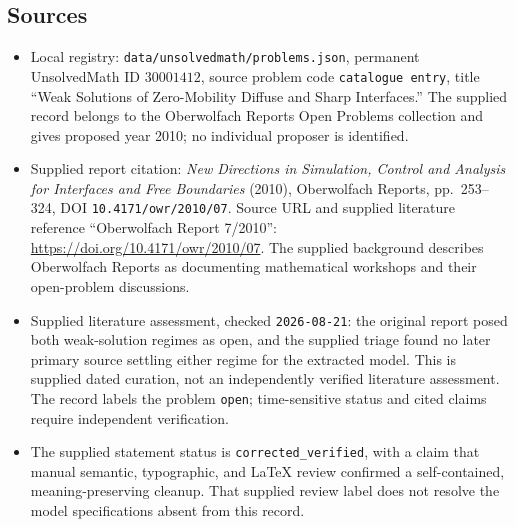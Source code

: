 \documentclass[11pt]{article}
\begin{document}
\subsection{Sources}
\begin{itemize}
\item Local registry: \texttt{data/unsolvedmath/problems.json}, permanent UnsolvedMath ID \(30001412\), source problem code \texttt{catalogue entry}, title ``Weak Solutions of Zero-Mobility Diffuse and Sharp Interfaces.'' The supplied record belongs to the Oberwolfach Reports Open Problems collection and gives proposed year 2010; no individual proposer is identified.
\item Supplied report citation: \emph{New Directions in Simulation, Control and Analysis for Interfaces and Free Boundaries} (2010), Oberwolfach Reports, pp.~253--324, DOI \texttt{10.4171/owr/2010/07}. Source URL and supplied literature reference ``Oberwolfach Report 7/2010'': \url{https://doi.org/10.4171/owr/2010/07}. The supplied background describes Oberwolfach Reports as documenting mathematical workshops and their open-problem discussions.
\item Supplied literature assessment, checked \texttt{2026-08-21}: the original report posed both weak-solution regimes as open, and the supplied triage found no later primary source settling either regime for the extracted model. This is supplied dated curation, not an independently verified literature assessment. The record labels the problem \texttt{open}; time-sensitive status and cited claims require independent verification.
\item The supplied statement status is \texttt{corrected\_verified}, with a claim that manual semantic, typographic, and LaTeX review confirmed a self-contained, meaning-preserving cleanup. That supplied review label does not resolve the model specifications absent from this record.
\end{itemize}
\end{document}
